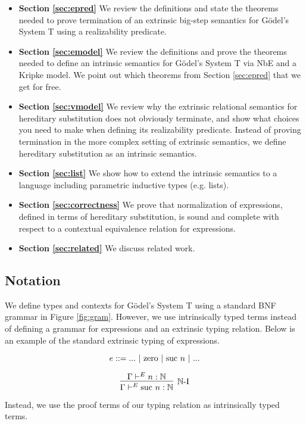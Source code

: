 \documentclass[preprint,nonatbib]{sigplanconf}
\numberwithin{mysubdfn}{mydfn}
\newcommand{\reffig}[1]{Figure \ref{fig:#1}}
\newcommand{\refsec}[1]{Section \ref{sec:#1}}
\def\nat{\mathbb{N}}
\newcommand{\con}[1]{\textmd{#1}}
\begin{document}
\begin{itemize}
\item{\bf{\refsec{epred}}}
We review the definitions and state the theorems needed to prove termination of
an extrinsic big-step semantics for G{\"o}del's System T using a
realizability predicate.

\item{\bf{\refsec{emodel}}}
We review the definitions and prove the theorems needed to define an
intrinsic semantics for G{\"o}del's System T via NbE and a Kripke
model. We point out which theorems from \refsec{epred} that we get for
free.

\item{\bf{\refsec{vmodel}}}
We review why the extrinsic relational semantics for hereditary
substitution does not obviously terminate, and show what choices you
need to make when defining its realizability predicate. Instead of
proving termination in the more complex setting of extrinsic
semantics, we define hereditary substitution as an intrinsic
semantics.

\item{\bf{\refsec{list}}}
We show how to extend the intrinsic semantics to a language including
parametric inductive types (e.g. lists).

\item{\bf{\refsec{correctness}}}
We prove that normalization of expressions, defined in terms of
hereditary substitution, is sound and complete with respect to a
contextual equivalence relation for expressions.

\item{\bf{\refsec{related}}}
We discuss related work.
\end{itemize}

\subsection{Notation}

We define types and contexts for G{\"o}del's System T using a standard
BNF grammar in \reffig{gram}. However, we use intrinsically typed
terms instead of defining a grammar for expressions and an extrinsic
typing relation. Below is an example of the standard extrinsic typing
of expressions.

$$
e ::= ... ~ | ~ \con{zero} ~ | ~ \con{suc} ~ n ~ | ~ ...
$$

$$
\infer
  [\nat\con{-I}]
  {\Gamma \vdash^E \con{suc} ~ n : \nat}
{
  \Gamma \vdash^E n : \nat
}
$$

Instead, we use the proof terms of our typing relation as
intrinsically typed terms.
\end{document}
